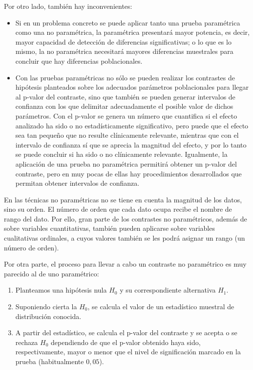 Por otro lado, también hay inconvenientes:

\begin{itemize}
\item Si en un problema concreto se puede aplicar tanto una prueba paramétrica como una no paramétrica, la paramétrica presentará mayor potencia, es decir, mayor capacidad de detección de diferencias significativas; o lo que es lo mismo, la no paramétrica necesitará mayores diferencias muestrales para concluir que hay diferencias poblacionales.
\item Con las pruebas paramétricas no sólo se pueden realizar los contrastes de hipótesis planteados sobre los adecuados parámetros poblacionales para llegar al p-valor del contraste, sino que también se pueden generar intervalos de confianza con los que delimitar adecuadamente el posible valor de dichos parámetros. Con el p-valor se genera un número que cuantifica si el efecto analizado ha sido o no estadísticamente significativo, pero puede que el efecto sea tan pequeño que no resulte clínicamente relevante, mientras que con el intervalo de confianza sí que se aprecia la magnitud del efecto, y por lo tanto se puede concluir si ha sido o no clínicamente relevante. Igualmente, la aplicación de una prueba no paramétrica permitirá obtener un p-valor del contraste, pero en muy pocas de ellas hay procedimientos desarrollados que permitan obtener intervalos de confianza.

\end{itemize}

En las técnicas no paramétricas no se tiene en cuenta la magnitud de los datos, sino su orden. El número de orden que cada dato ocupa recibe el nombre de rango del dato. Por ello, gran parte de los contrastes no paramétricos, además de sobre variables cuantitativas, también pueden aplicarse sobre variables cualitativas ordinales, a cuyos valores también se les podrá asignar un rango (un número de orden).

Por otra parte, el proceso para llevar a cabo un contraste no paramétrico es muy parecido al de uno paramétrico:

\begin{enumerate}
\item Planteamos una hipótesis nula $H_0$ y su correspondiente alternativa $H_1$.
\item Suponiendo cierta la $H_0$, se calcula el valor de un estadístico muestral de distribución conocida.
\item A partir del estadístico, se calcula el p-valor del contraste y se acepta o se rechaza $H_0$ dependiendo de que el p-valor obtenido haya sido, respectivamente, mayor o menor que el nivel de significación marcado en la prueba (habitualmente $0,05$).
\end{enumerate}


